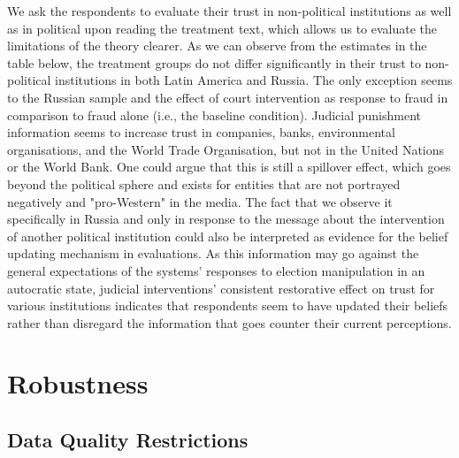 \documentclass[11pt, ngerman,english,a4]{article}
\begin{document}
We ask the respondents to evaluate their trust in non-political institutions as well as in political upon reading the treatment text, which allows us to evaluate the limitations of the theory clearer. As we can observe from the estimates in the table below, the treatment groups do not differ significantly in their trust to non-political institutions in both Latin America and Russia. The only exception seems to the Russian sample and the effect of court intervention as response to fraud in comparison to fraud alone (i.e., the baseline condition). Judicial punishment information seems to increase trust in companies, banks, environmental organisations, and the World Trade Organisation, but not in the United Nations or the World Bank. One could argue that this is still a spillover effect, which goes beyond the political sphere and exists for entities that are not portrayed negatively and "pro-Western" in the media. The fact that we observe it specifically in Russia and only in response to the message about the intervention of another political institution could also be interpreted as evidence for the belief updating mechanism in evaluations. As this information may go against the general expectations of the systems' responses to election manipulation in an autocratic state, judicial interventions' consistent restorative effect on trust for various institutions indicates that respondents seem to have updated their beliefs rather than disregard the information that goes counter their current perceptions. 



    

\clearpage


\normalsize

\clearpage
\section*{Robustness}

\subsection*{Data Quality Restrictions}

% 

% 
\end{document}
